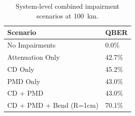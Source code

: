 \begin{table}[!ht]
  \caption{System-level combined impairment scenarios at 100~km.}
  \label{tab:system}
  \centering
  \begin{tabular}{l l}
    \toprule
    Scenario & QBER \\
    \midrule
    No Impairments & 0.0\% \\
    Attenuation Only & 42.7\% \\
    CD Only & 45.2\% \\
    PMD Only & 43.0\% \\
    CD + PMD & 43.0\% \\
    CD + PMD + Bend (R=1cm) & 70.1\% \\
    \bottomrule
  \end{tabular}
\end{table}
